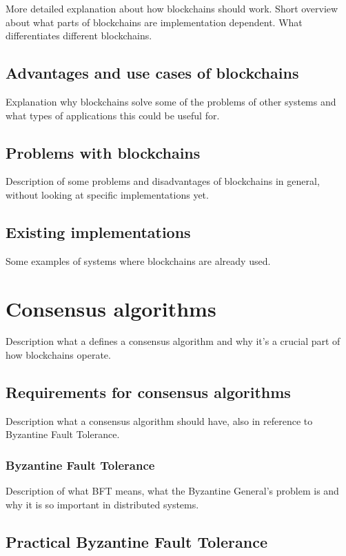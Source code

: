 \documentclass{acm_proc_article-sp}
\begin{document}
More detailed explanation about how blockchains should work. Short overview about what parts of blockchains are implementation dependent. What differentiates different blockchains.


\subsection{Advantages and use cases of blockchains}

Explanation why blockchains solve some of the problems of other systems and what types of applications this could be useful for.


\subsection{Problems with blockchains}

Description of some problems and disadvantages of blockchains in general, without looking at specific implementations yet.


\subsection{Existing implementations}

Some examples of systems where blockchains are already used.


\section{Consensus algorithms}

Description what a defines a consensus algorithm and why it's a crucial part of how blockchains operate.


\subsection{Requirements for consensus algorithms}

Description what a consensus algorithm should have, also in reference to Byzantine Fault Tolerance.


\subsubsection{Byzantine Fault Tolerance}

Description of what BFT means, what the Byzantine General's problem is and why it is so important in distributed systems.


\subsection{Practical Byzantine Fault Tolerance}
\end{document}
